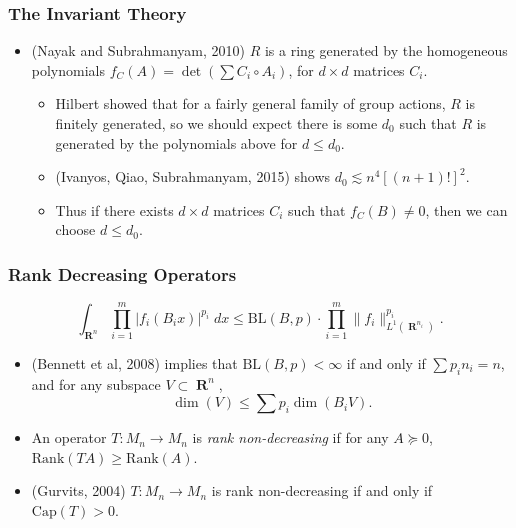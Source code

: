 \documentclass[handout,usenames,dvipsnames,12pt]{beamer}
\DeclareMathOperator{\RR}{\mathbf{R}}
\begin{document}
\begin{frame}

\frametitle{The Invariant Theory}

\begin{itemize}
    \pause
    \item (Nayak and Subrahmanyam, 2010) $R$ is a ring generated by the homogeneous polynomials $f_C(A) = \det(\sum C_i \circ A_i)$, for $d \times d$ matrices $C_i$.
    \begin{itemize}
        \pause
        \item Hilbert showed that for a fairly general family of group actions, $R$ is finitely generated, so we should expect there is some $d_0$ such that $R$ is generated by the polynomials above for $d \leq d_0$.

        \pause
        \item (Ivanyos, Qiao, Subrahmanyam, 2015) shows $d_0 \lesssim n^4 [(n+1)!]^2$.

        \pause
        \item Thus if there exists $d \times d$ matrices $C_i$ such that $f_C(B) \neq 0$, then we can choose $d \leq d_0$.
    \end{itemize}
\end{itemize}

\end{frame}










\begin{frame}
    \frametitle{Rank Decreasing Operators}

    \[ \int_{\RR^n} \prod_{i = 1}^m |f_i(B_i x)|^{p_i}\; dx \leq \text{BL}(B,p) \cdot \prod_{i=1}^m \| f_i \|_{L^1(\RR^{n_i})}^{p_i}.  \]

    \begin{itemize}
        \pause
        \item (Bennett et al, 2008) implies that $\text{BL}(B,p) < \infty$ if and only if $\sum p_i n_i = n$, and for any subspace $V \subset \RR^n$,
        \[ \dim(V) \leq \sum p_i \dim(B_i V). \]

        \pause
        \item An operator $T: M_n \to M_n$ is \emph{rank non-decreasing} if for any $A \succeq 0$, $\text{Rank}(TA) \geq \text{Rank}(A)$.

        \pause
        \item (Gurvits, 2004) $T: M_n \to M_n$ is rank non-decreasing if and only if $\text{Cap}(T) > 0$.
    \end{itemize}
\end{frame}
\end{document}
